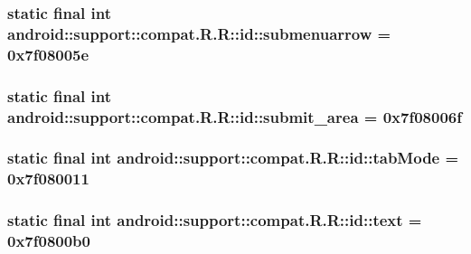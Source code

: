 \hypertarget{classandroid_1_1support_1_1compat_1_1_r_1_1id_0691332e00d9a01f774a43cbb263c5b0}{
\subsubsection[{submenuarrow}]{\setlength{\rightskip}{0pt plus 5cm}static final int android::support::compat.R.R::id::submenuarrow = 0x7f08005e}}
\label{classandroid_1_1support_1_1compat_1_1_r_1_1id_0691332e00d9a01f774a43cbb263c5b0}


\hypertarget{classandroid_1_1support_1_1compat_1_1_r_1_1id_80e71c0b363afbc882c5cf959bc8f1fc}{
\subsubsection[{submit\_\-area}]{\setlength{\rightskip}{0pt plus 5cm}static final int android::support::compat.R.R::id::submit\_\-area = 0x7f08006f}}
\label{classandroid_1_1support_1_1compat_1_1_r_1_1id_80e71c0b363afbc882c5cf959bc8f1fc}


\hypertarget{classandroid_1_1support_1_1compat_1_1_r_1_1id_3e605c628d6414b059fcf7acce8da50b}{
\subsubsection[{tabMode}]{\setlength{\rightskip}{0pt plus 5cm}static final int android::support::compat.R.R::id::tabMode = 0x7f080011}}
\label{classandroid_1_1support_1_1compat_1_1_r_1_1id_3e605c628d6414b059fcf7acce8da50b}


\hypertarget{classandroid_1_1support_1_1compat_1_1_r_1_1id_9be13b39445a7b40bb5ff2a6b5238c83}{
\subsubsection[{text}]{\setlength{\rightskip}{0pt plus 5cm}static final int android::support::compat.R.R::id::text = 0x7f0800b0}}
\label{classandroid_1_1support_1_1compat_1_1_r_1_1id_9be13b39445a7b40bb5ff2a6b5238c83}


